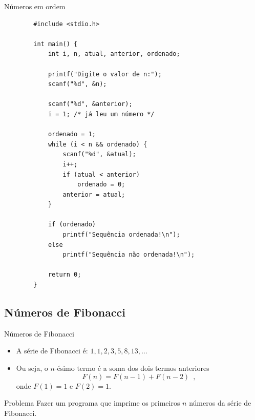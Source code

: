 \documentclass[handout]{beamer}
\begin{document}
\begin{frame}[fragile]{Números em ordem}

    \begin{verbatim}
        #include <stdio.h>
        
        int main() {
            int i, n, atual, anterior, ordenado;

            printf("Digite o valor de n:");
            scanf("%d", &n);

            scanf("%d", &anterior);
            i = 1; /* já leu um número */

            ordenado = 1;
            while (i < n && ordenado) {
                scanf("%d", &atual);
                i++;
                if (atual < anterior)
                    ordenado = 0;
                anterior = atual;
            }

            if (ordenado)
                printf("Sequência ordenada!\n");
            else
                printf("Sequência não ordenada!\n");

            return 0;
        }
    \end{verbatim}
\end{frame}

\subsection{Números de Fibonacci}%

\begin{frame}[fragile]{Números de Fibonacci}
    
    \begin{itemize}
        \item A série de Fibonacci é: $1, 1, 2, 3, 5, 8, 13, \ldots$
        \item Ou seja, o $n$-ésimo termo é a soma dos dois termos anteriores 
        $$F(n) = F(n-1) + F(n-2) \enspace,$$
        onde $F(1)=1$ e $F(2)=1$.
    \end{itemize}

    \begin{block}{Problema}
        Fazer um programa que imprime os primeiros $n$ números da série de Fibonacci.
    \end{block}

\end{frame}
\end{document}
